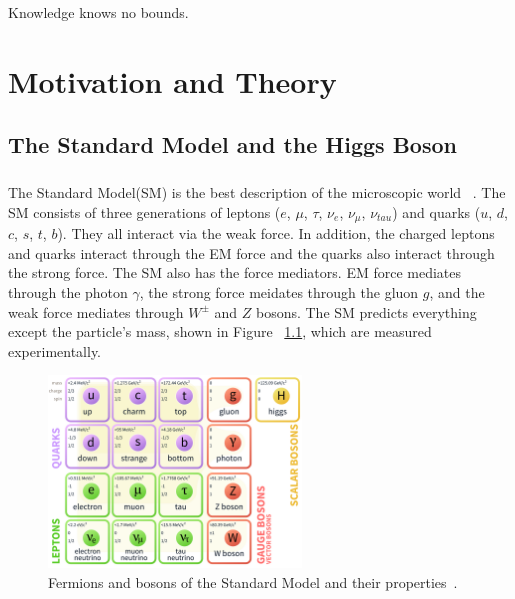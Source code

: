 \begin{savequote}[75mm]
Knowledge knows no bounds.
\end{savequote}

\chapter{Motivation and Theory}

\section{The Standard Model and the Higgs Boson}
\paragraph{}
The Standard Model(SM) is the best description of the microscopic world ~\cite{Griffiths,Tully,Pdg,Schwartz}. 
The SM consists of three generations of leptons ($e$, $\mu$, $\tau$, $\nu_e$, $\nu_{\mu}$, $\nu_{tau}$) and quarks ($u$, $d$, $c$, $s$, $t$, $b$).
They all interact via the weak force. In addition, the charged leptons and quarks interact through the EM force and the quarks also interact through the strong force.
The SM also has the force mediators. EM force mediates through the photon $\gamma$, the strong force meidates through the gluon $g$, and the weak force mediates through $W^{\pm}$ and $Z$ bosons.
The SM predicts everything except the particle's mass, shown in Figure ~\ref{fig:SM}, which are measured experimentally.

\begin{figure}[h!]
  \centering
  \captionsetup{justification=centering}
  \includegraphics[width=0.6\textwidth]{figures/theory/SM}
  \caption{Fermions and bosons of the Standard Model and their properties~\cite{Pdg}.}
  \label{fig:SM}
\end{figure}

